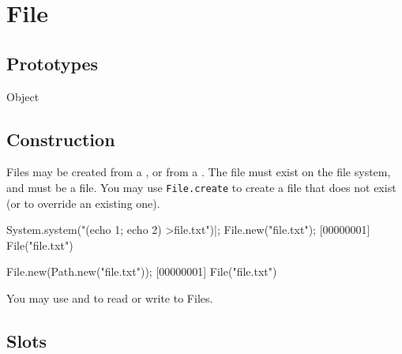 \section{File}

\subsection{Prototypes}
\begin{refObjects}
\item[Object]
\end{refObjects}

\subsection{Construction}

Files may be created from a , or from a
.  The file must exist on the file system, and must be
a file.  You may use \lstinline|File.create| to create a file that
does not exist (or to override an existing one).

\begin{urbiscript}[firstnumber=1]
System.system("(echo 1; echo 2) >file.txt")|;
File.new("file.txt");
[00000001] File("file.txt")

File.new(Path.new("file.txt"));
[00000001] File("file.txt")
\end{urbiscript}

You may use  and  to
read or write to Files.

\subsection{Slots}

